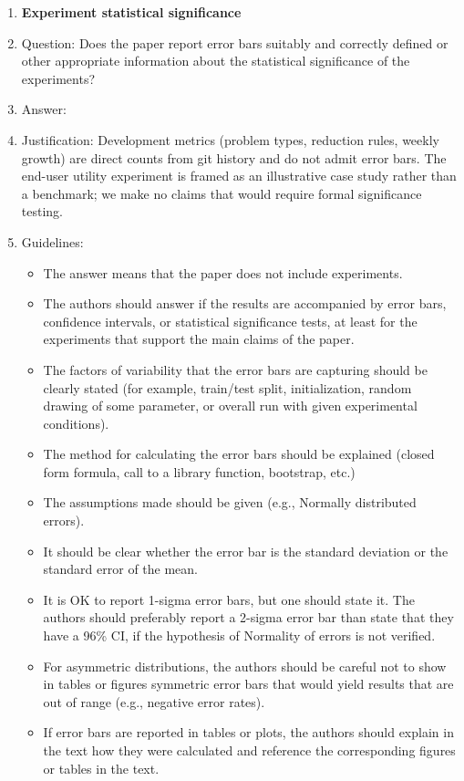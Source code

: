 \begin{enumerate}
\item {\bf Experiment statistical significance}
    \item[] Question: Does the paper report error bars suitably and correctly defined or other appropriate information about the statistical significance of the experiments?
    \item[] Answer: \answerNA{}
    \item[] Justification: Development metrics (problem types, reduction rules, weekly growth) are direct counts from git history and do not admit error bars. The end-user utility experiment is framed as an illustrative case study rather than a benchmark; we make no claims that would require formal significance testing.
    \item[] Guidelines:
    \begin{itemize}
        \item The answer \answerNA{} means that the paper does not include experiments.
        \item The authors should answer \answerYes{} if the results are accompanied by error bars, confidence intervals, or statistical significance tests, at least for the experiments that support the main claims of the paper.
        \item The factors of variability that the error bars are capturing should be clearly stated (for example, train/test split, initialization, random drawing of some parameter, or overall run with given experimental conditions).
        \item The method for calculating the error bars should be explained (closed form formula, call to a library function, bootstrap, etc.)
        \item The assumptions made should be given (e.g., Normally distributed errors).
        \item It should be clear whether the error bar is the standard deviation or the standard error of the mean.
        \item It is OK to report 1-sigma error bars, but one should state it. The authors should preferably report a 2-sigma error bar than state that they have a 96\% CI, if the hypothesis of Normality of errors is not verified.
        \item For asymmetric distributions, the authors should be careful not to show in tables or figures symmetric error bars that would yield results that are out of range (e.g., negative error rates).
        \item If error bars are reported in tables or plots, the authors should explain in the text how they were calculated and reference the corresponding figures or tables in the text.
    \end{itemize}


\end{enumerate}
